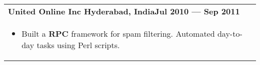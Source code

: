 \documentclass{article}
\begin{document}
\begin{tabular}{p{\dimexpr\linewidth-2\tabcolsep}}
    \bigskip
    {\bfseries United Online Inc \hfill Hyderabad, India\hfill Jul 2010 --- Sep 2011} \\
    \begin{itemize}
      \item Built a \textbf{RPC} framework for spam filtering.  Automated day-to-day tasks using Perl scripts.
    \end{itemize}

\end{tabular}
\end{document}
